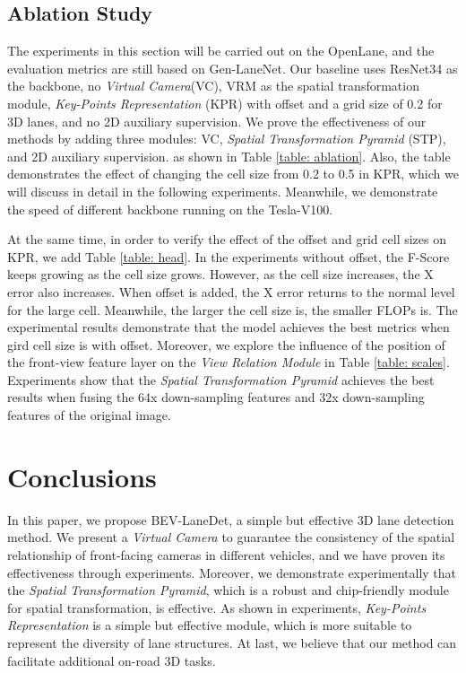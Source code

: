 \documentclass[10pt,twocolumn,letterpaper]{article}
\begin{document}
\subsection{Ablation Study}
\label{sec: ablation}
The experiments in this section will be carried out on the OpenLane, and the evaluation metrics are still based on Gen-LaneNet\cite{guo2020gen}. Our baseline uses ResNet34 as the backbone, no \textit{Virtual Camera}(VC), VRM \cite{pan2020cross} as the spatial transformation module, \textit{Key-Points Representation} (KPR) with offset and a grid size of 0.2 for 3D lanes, and no 2D auxiliary supervision. We prove the effectiveness of our methods by adding three modules: VC, \textit{Spatial Transformation Pyramid} (STP), and 2D auxiliary supervision. as shown in Table \ref{table: ablation}. Also, the table demonstrates the effect of changing the cell size from 0.2 to 0.5 in KPR, which we will discuss in detail in the following experiments. Meanwhile, we demonstrate the speed of different backbone running on the Tesla-V100.


At the same time, in order to verify the effect of the offset and grid cell sizes on KPR, we add Table \ref{table: head}. In the experiments without offset, the F-Score keeps growing as the cell size grows. However, as the cell size increases, the X error also increases. When offset is added, the X error returns to the normal level for the large cell. Meanwhile, the larger the cell size is, the smaller FLOPs is. The experimental results demonstrate that the model achieves the best metrics when gird cell size is   with offset.
Moreover, we explore the influence of the position of the front-view feature layer on the \textit{View Relation Module}\cite{pan2020cross} in Table \ref{table: scales}. Experiments show that the \textit{Spatial Transformation Pyramid} achieves the best results when fusing the 64x down-sampling features and 32x down-sampling features of the original image.

\section{Conclusions}
In this paper, we propose BEV-LaneDet, a simple but effective 3D lane detection method. We present a \textit{Virtual Camera} to guarantee the consistency of the spatial relationship of front-facing cameras in different vehicles, and we have proven its effectiveness through experiments. Moreover, we demonstrate experimentally that the \textit{Spatial Transformation Pyramid}, which is a robust and chip-friendly module for spatial transformation, is effective. As shown in experiments, \textit{Key-Points Representation} is a simple but effective module, which is more suitable to represent the diversity of lane structures. At last, we believe that our method can facilitate additional on-road 3D tasks.
\end{document}
